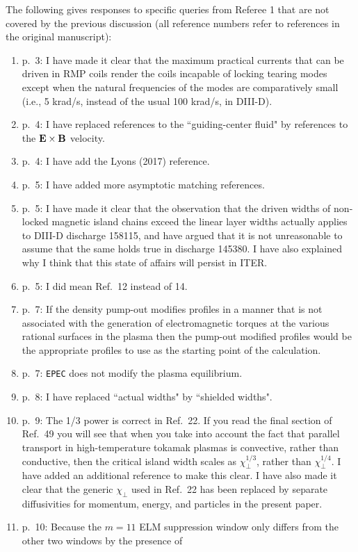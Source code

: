 \documentclass{article}[12pt]
\begin{document}
The following gives responses to specific queries from Referee 1 that are not covered by the previous discussion (all reference numbers refer to references in the
original manuscript):
\begin{enumerate}
\item p.~3: I have made it clear that the maximum practical currents that can be driven in RMP coils render
the coils incapable of locking tearing modes except when the natural frequencies of the modes are
comparatively small (i.e., 5 krad/s, instead of the usual 100 krad/s, in DIII-D).
\item p.~4: I have replaced references to the ``guiding-center fluid" by references to the ${\bf E}\times {\bf B}$ velocity.
\item p.~4: I have add the Lyons (2017) reference. 
\item p.~5: I have added more asymptotic matching references. 
\item p.~5: I have made it clear that the observation that the driven widths of non-locked magnetic
island chains exceed the linear layer widths actually applies to DIII-D discharge 158115, and have argued
that it is not unreasonable to assume that the same holds true in discharge 145380. I have also explained
why I think that this state of affairs will persist in ITER.
\item p.~5: I did mean Ref.~12 instead of 14.
\item  p.~7: If the density pump-out modifies profiles in a manner that is not associated with the generation of
electromagnetic torques at the various rational surfaces in the plasma then the pump-out modified 
profiles would be the appropriate profiles to use as the starting point of the calculation. 
\item p.~7: {\tt EPEC} does not modify the plasma equilibrium. 
\item p.~8: I have replaced ``actual widths" by ``shielded widths". 
\item p.~9: The 1/3 power is correct in Ref.~22. If you read the final section of Ref.~49 you will see that
when you take into account the fact that parallel transport in high-temperature tokamak plasmas is
convective, rather than conductive, then the critical island width scales as $\chi_\perp^{1/3}$, rather than
$\chi_\perp^{1/4}$. I have added an additional reference to make this clear. I have also made it clear that the
generic $\chi_\perp$ used in Ref.~22 has been replaced by separate diffusivities for momentum, energy, and particles
in the present paper. 
\item p.~10: Because the $m=11$ ELM suppression window only differs from the other two windows by the presence of

\end{enumerate}
\end{document}
